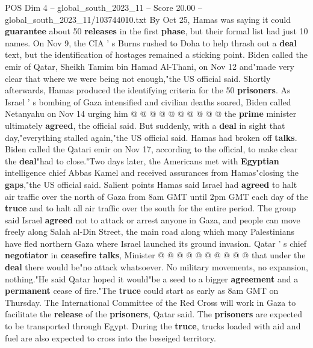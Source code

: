 \begin{textsample}{POS Dim 4 – global\_south\_2023\_11 – Score 20.00 – global\_south\_2023\_11/103744010.txt}
By Oct 25, Hamas was saying it could \textbf{guarantee} about 50 \textbf{releases} in the first \textbf{phase}, but their formal list had just 10 names.
On Nov 9, the CIA ' s Burns rushed to Doha to help thrash out a \textbf{deal} text, but the identification of hostages remained a sticking point.
Biden called the emir of Qatar, Sheikh Tamim bin Hamad Al-Thani, on Nov 12 and"made very clear that where we were being not enough,"the US official said.
Shortly afterwards, Hamas produced the identifying criteria for the 50 \textbf{prisoners}.
As Israel ' s bombing of Gaza intensified and civilian deaths soared, Biden called Netanyahu on Nov 14 urging him @ @ @ @ @ @ @ @ @ @ the \textbf{prime} minister ultimately \textbf{agreed}, the official said.
But suddenly, with a \textbf{deal} in sight that day,"everything stalled again,"the US official said.
Hamas had broken off \textbf{talks}.
Biden called the Qatari emir on Nov 17, according to the official, to make clear the \textbf{deal}"had to close."Two days later, the Americans met with \textbf{Egyptian} intelligence chief Abbas Kamel and received assurances from Hamas"closing the \textbf{gaps},"the US official said.
Salient points Hamas said Israel had \textbf{agreed} to halt air traffic over the north of Gaza from 8am GMT until 2pm GMT each day of the \textbf{truce} and to halt all air traffic over the south for the entire period.
The group said Israel \textbf{agreed} not to attack or arrest anyone in Gaza, and people can move freely along Salah al-Din Street, the main road along which many Palestinians have fled northern Gaza where Israel launched its ground invasion.
Qatar ' s chief \textbf{negotiator} in \textbf{ceasefire} \textbf{talks}, Minister @ @ @ @ @ @ @ @ @ @ that under the \textbf{deal} there would be"no attack whatsoever.
No military movements, no expansion, nothing."He said Qatar hoped it would"be a seed to a bigger \textbf{agreement} and a \textbf{permanent} cease of fire."The \textbf{truce} could start as early as 8am GMT on Thursday.
The International Committee of the Red Cross will work in Gaza to facilitate the \textbf{release} of the \textbf{prisoners}, Qatar said.
The \textbf{prisoners} are expected to be transported through Egypt.
During the \textbf{truce}, trucks loaded with aid and fuel are also expected to cross into the beseiged territory.

\end{textsample}

